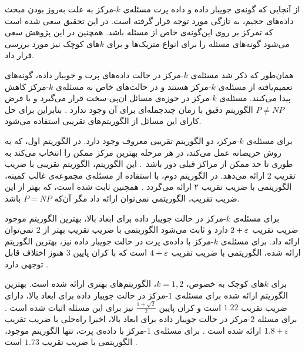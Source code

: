 از آنجایی که گونه‌ی جویبار داده و داده پرت مسئله‌ی $k$-مرکز به علت به‌روز بودن مبحث داده‌های حجیم، به تازگی مورد توجه قرار گرفته است.
در این تحقیق سعی شده است که تمرکز بر روی این‌گونه‌ی خاص از مسئله باشد.
همچنین در این پژوهش سعی می‌شود گونه‌های مسئله را برای انواع متریک‌ها و برای $k$های کوچک نیز مورد بررسی قرار داد. 


همان‌طور که ذکر شد مسئله‌ی $k$-مرکز در حالت داده‌های پرت و جویبار داده، گونه‌های تعمیم‌یافته از مسئله‌ی $k$-مرکز هستند و در حالت‌های خاص به مسئله‌ی $k$-مرکز کاهش پیدا می‌کنند.
مسئله‌ی $k$-مرکز در حوزه‌ی مسائل ان‌پی-سخت قرار می‌گیرد و با فرض $P \neq NP$ الگوریتم دقیق با زمان چندجمله‌ای برای آن وجود ندارد .
بنابراین برای حل کارای این مسائل از الگوریتم‌های تقریبی استفاده می‌شود.

برای مسئله‌ی $k$-مرکز، دو الگوریتم تقریبی معروف وجود دارد.
در الگوریتم اول، که به روش حریصانه عمل می‌کند، در هر مرحله بهترین مرکز ممکن را انتخاب می‌کند به طوری تا حد ممکن از مراکز قبلی دور باشد~.
این الگوریتم، الگوریتم تقریبی با ضریب تقریب 2 ارائه می‌دهد.
در الگوریتم دوم، با استفاده از مسئله‌ی مجموعه‌ی غالب کمینه، الگوریتمی با ضریب تقریب ۲ ارائه می‌گردد .
همچنین ثابت شده است، که بهتر از این ضریب تقریب، الگوریتمی نمی‌توان ارائه داد مگر آن‌که $P = NP$ باشد.

برای مسئله‌ی $k$-مرکز در حالت جویبار داده برای ابعاد بالا، بهترین الگوریتم موجود ضریب تقریب $2 + \varepsilon$ دارد  و ثابت می‌شود الگوریتمی با ضریب تقریب بهتر از $2$ نمی‌توان ارائه داد. برای مسئله‌ی $k$-مرکز با داده‌ی پرت در حالت جویبار داده نیز، بهترین الگوریتم ارائه شده، الگوریتمی با ضریب تقریب $4 + \varepsilon$ است که با کران پایین $3$ هنوز اختلاف قابل توجهی دارد . 

برای $k$های کوچک به خصوص، $k =1, 2$، الگوریتم‌های بهتری ارائه شده است. بهترین الگوریتم ارائه شده برای مسئله‌ی $1$-مرکز در حالت جویبار داده برای ابعاد بالا، دارای ضریب تقریب $1.22$ است و کران پایین $\frac{1 + \sqrt{2}}{2}$ نیز برای این مسئله اثبات شده است . برای مسئله $2$-مرکز در حالت جویبار داده برای ابعاد بالا، اخیرا راه‌حلی با ضریب تقریب $1.8 + \varepsilon$ ارائه شده است . برای مسئله‌ی $1$-مرکز با داده‌ی پرت، تنها الگوریتم موجود، الگوریتمی با ضریب تقریب $1.73$ است .

